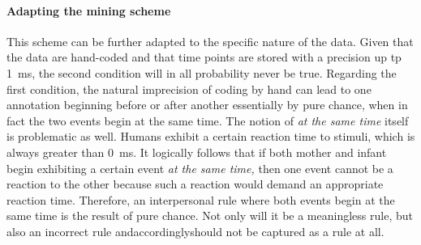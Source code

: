 \paragraph{Adapting the mining scheme}
This scheme can be further adapted to the specific nature of the data.
Given that the data are hand-coded and that time points are stored with a precision up tp 1~ms, the second condition will in all probability never be true.
Regarding the first condition, the natural imprecision of coding by hand can lead to one annotation beginning before or after another essentially by pure chance, when in fact the two events begin at the same time.
The notion of \emph{at the same time} itself is problematic as well.
Humans exhibit a certain reaction time to stimuli, which is always greater than 0~ms.
It logically follows that if both mother and infant begin exhibiting a certain event \emph{at the same time,} then one event cannot be a reaction to the other because such a reaction would demand an appropriate reaction time.
Therefore, an interpersonal rule where both events begin at the same time is the result of pure chance.
Not only will it be a meaningless rule, but also an incorrect rule and\dash accordingly\dash should not be captured as a rule at all.


